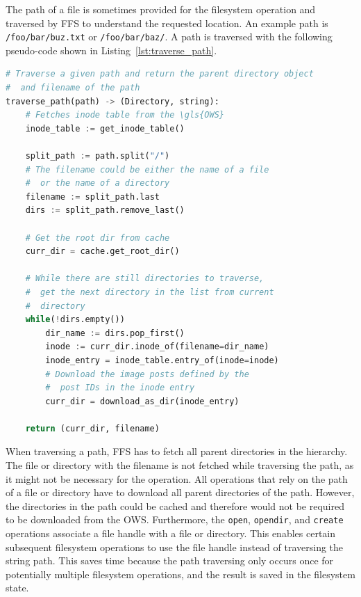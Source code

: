 The path of a file is sometimes provided for the filesystem operation and traversed by \gls{FFS} to understand the requested location. An example path is \texttt{/foo/bar/buz.txt} or \texttt{/foo/bar/baz/}. A path is traversed with the following \mbox{pseudo-code} shown in Listing~\ref{lst:traverse_path}.

\begin{lstlisting}[language=python, caption={Pseudocode of traversing a given path, returning the \texttt{Directory} and the filename}, label=lst:traverse_path,breaklines=true, basicstyle=\footnotesize, float]
# Traverse a given path and return the parent directory object
#  and filename of the path
traverse_path(path) -> (Directory, string):
	# Fetches inode table from the \gls{OWS}
	inode_table := get_inode_table()
	
	split_path := path.split("/")
	# The filename could be either the name of a file 
	#  or the name of a directory
	filename := split_path.last
	dirs := split_path.remove_last()

	# Get the root dir from cache
	curr_dir = cache.get_root_dir()

	# While there are still directories to traverse,
	#  get the next directory in the list from current
	#  directory
	while(!dirs.empty())
		dir_name := dirs.pop_first()
		inode := curr_dir.inode_of(filename=dir_name)
		inode_entry = inode_table.entry_of(inode=inode)
		# Download the image posts defined by the 
		#  post IDs in the inode entry
		curr_dir = download_as_dir(inode_entry)
	
	return (curr_dir, filename)

\end{lstlisting}

When traversing a path, \gls{FFS} has to fetch all parent directories in the hierarchy. The file or directory with the filename is not fetched while traversing the path, as it might not be necessary for the operation. All operations that rely on the path of a file or directory have to download all parent directories of the path. However, the directories in the path could be cached and therefore would not be required to be downloaded from the \gls{OWS}. Furthermore, the \texttt{open}, \texttt{opendir}, and \texttt{create} operations associate a file handle with a file or directory. This enables certain subsequent filesystem operations to use the file handle instead of traversing the string path. This saves time because the path traversing only occurs once for potentially multiple filesystem operations, and the result is saved in the filesystem state.

